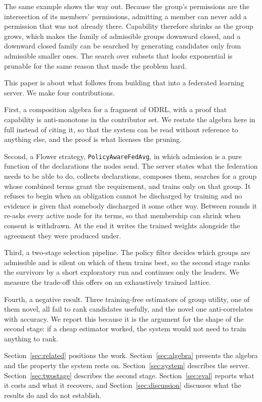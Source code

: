 \documentclass[10pt,conference]{IEEEtran}
\begin{document}
The same example shows the way out. Because the group's permissions are the
intersection of its members' permissions, admitting a member can never add a
permission that was not already there. Capability therefore shrinks as the group
grows, which makes the family of admissible groups downward closed, and a
downward closed family can be searched by generating candidates only from
admissible smaller ones. The search over subsets that looks exponential is
prunable for the same reason that made the problem hard.

This paper is about what follows from building that into a federated learning
server. We make four contributions.

First, a composition algebra for a fragment of ODRL, with a proof that
capability is anti-monotone in the contributor set. We restate the algebra here in full instead of citing it, so that the system can be read without reference to
anything else, and the proof is what licenses the pruning.

Second, a Flower strategy, \texttt{PolicyAwareFedAvg}, in which admission is a
pure function of the declarations the nodes send. The server states what the
federation needs to be able to do, collects declarations, composes them,
searches for a group whose combined terms grant the requirement, and trains only
on that group. It refuses to begin when an obligation cannot be discharged by training and no evidence is given that somebody discharged it some other way. Between rounds it re-asks every active node for its terms, so that membership can shrink when consent is withdrawn. At the end it writes the trained weights alongside the agreement they were produced under.

Third, a two-stage selection pipeline. The policy filter decides which groups
are admissible and is silent on which of them trains best, so the second stage
ranks the survivors by a short exploratory run and continues only the leaders.
We measure the trade-off this offers on an exhaustively trained lattice.

Fourth, a negative result. Three training-free estimators of group utility, one
of them novel, all fail to rank candidates usefully, and the novel one
anti-correlates with accuracy. We report this because it is the argument for the
shape of the second stage: if a cheap estimator worked, the system would not
need to train anything to rank.

Section~\ref{sec:related} positions the work. Section~\ref{sec:algebra}
presents the algebra and the property the system rests on.
Section~\ref{sec:system} describes the server. Section~\ref{sec:twostage}
describes the second stage. Section~\ref{sec:eval} reports what it costs and
what it recovers, and Section~\ref{sec:discussion} discusses what the results
do and do not establish.
\end{document}
